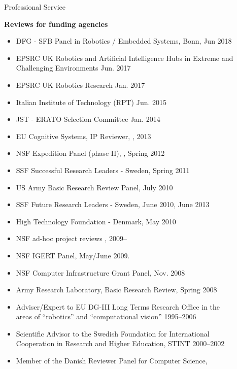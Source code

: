 \documentclass{article}
\begin{document}
\begin{cv}
\begin{cvlist}{Professional Service}
\item {\bf Reviews for funding agencies}
  \begin{itemize}
  \item DFG - SFB Panel in Robotics / Embedded Systems,
    Bonn,\cftdotfill{\cftdotsep} Jun 2018
  \item EPSRC UK Robotics and Artificial Intelligence Hubs in Extreme
    and Challenging Environments \cftdotfill{\cftdotsep} Jun. 2017
  \item EPSRC UK Robotics Research  \cftdotfill{\cftdotsep} Jan. 2017
  \item Italian Institute of Technology (RPT) \cftdotfill{\cftdotsep}
    Jun. 2015
 \item JST - ERATO Selection Committee \cftdotfill{\cftdotsep} Jan. 2014
 \item EU Cognitive Systems, IP Reviewer, \cftdotfill{\cftdotsep}, 2013
 \item NSF Expedition Panel (phase II), \cftdotfill{\cftdotsep},
   Spring 2012
 \item SSF Successful Research Leaders - Sweden,
   \cftdotfill{\cftdotsep} Spring 2011
 \item US Army Basic Research Review Panel, \cftdotfill{\cftdotsep} July 2010
 \item SSF Future Research Leaders - Sweden, \cftdotfill{\cftdotsep} June 2010, June 2013
 \item High Technology Foundation - Denmark, \cftdotfill{\cftdotsep}  May 2010
 \item NSF ad-hoc project reviews \cftdotfill{\cftdotsep}, 2009--
 \item NSF IGERT Panel, \cftdotfill{\cftdotsep} May/June 2009.
 \item NSF Computer Infrastructure Grant Panel,  \cftdotfill{\cftdotsep} Nov. 2008
 \item Army Research Laboratory, Basic Research Review, \cftdotfill{\cftdotsep}  Spring 2008
 \item Adviser/Expert to EU DG-III Long Terms Research Office in the\\
   areas of ``robotics'' and ``computational vision''
   \cftdotfill{\cftdotsep}  1995--2006
 \item Scientific Advisor to the Swedish Foundation for International\\
   Cooperation in Research and Higher Education,  STINT
   \cftdotfill{\cftdotsep}  2000--2002
 \item Member of the Danish Reviewer Panel for Computer Science,\\

\end{itemize}
\end{cvlist}
\end{cv}
\end{document}
